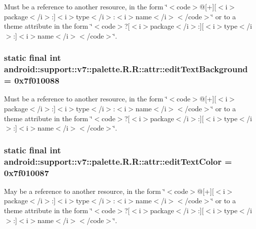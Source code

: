 Must be a reference to another resource, in the form \char`\"{}$<$code$>$@\mbox{[}+\mbox{]}\mbox{[}$<$i$>$package$<$/i$>$:\mbox{]}$<$i$>$type$<$/i$>$:$<$i$>$name$<$/i$>$$<$/code$>$\char`\"{} or to a theme attribute in the form \char`\"{}$<$code$>$?\mbox{[}$<$i$>$package$<$/i$>$:\mbox{]}\mbox{[}$<$i$>$type$<$/i$>$:\mbox{]}$<$i$>$name$<$/i$>$$<$/code$>$\char`\"{}. \hypertarget{classandroid_1_1support_1_1v7_1_1palette_1_1_r_1_1attr_d5ca95fd5920d3810abf67f0049d1ee0}{
\subsubsection[{editTextBackground}]{\setlength{\rightskip}{0pt plus 5cm}static final int android::support::v7::palette.R.R::attr::editTextBackground = 0x7f010088}}
\label{classandroid_1_1support_1_1v7_1_1palette_1_1_r_1_1attr_d5ca95fd5920d3810abf67f0049d1ee0}


Must be a reference to another resource, in the form \char`\"{}$<$code$>$@\mbox{[}+\mbox{]}\mbox{[}$<$i$>$package$<$/i$>$:\mbox{]}$<$i$>$type$<$/i$>$:$<$i$>$name$<$/i$>$$<$/code$>$\char`\"{} or to a theme attribute in the form \char`\"{}$<$code$>$?\mbox{[}$<$i$>$package$<$/i$>$:\mbox{]}\mbox{[}$<$i$>$type$<$/i$>$:\mbox{]}$<$i$>$name$<$/i$>$$<$/code$>$\char`\"{}. \hypertarget{classandroid_1_1support_1_1v7_1_1palette_1_1_r_1_1attr_6ba62f0f21f3354f591614734ba80bbe}{
\subsubsection[{editTextColor}]{\setlength{\rightskip}{0pt plus 5cm}static final int android::support::v7::palette.R.R::attr::editTextColor = 0x7f010087}}
\label{classandroid_1_1support_1_1v7_1_1palette_1_1_r_1_1attr_6ba62f0f21f3354f591614734ba80bbe}


May be a reference to another resource, in the form \char`\"{}$<$code$>$@\mbox{[}+\mbox{]}\mbox{[}$<$i$>$package$<$/i$>$:\mbox{]}$<$i$>$type$<$/i$>$:$<$i$>$name$<$/i$>$$<$/code$>$\char`\"{} or to a theme attribute in the form \char`\"{}$<$code$>$?\mbox{[}$<$i$>$package$<$/i$>$:\mbox{]}\mbox{[}$<$i$>$type$<$/i$>$:\mbox{]}$<$i$>$name$<$/i$>$$<$/code$>$\char`\"{}. 

